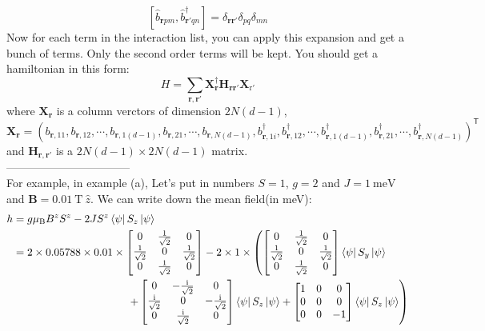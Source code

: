 \documentclass[letter]{article}
\newcommand{\ii}{\mathrm{i}}
\begin{document}
$$
\left[\hat{b}_{\bm{r}pm},\hat{b}^{\dagger}_{\bm{r}'qn}\right]=\delta_{\bm{r}\bm{r}'}\delta_{pq}\delta_{mn}$$
Now for each term in the interaction list, you can apply this expansion and get a bunch of terms. Only the second order terms will be kept. You should get a hamiltonian in this form:
 $$H=\sum_{\bm{r},\bm{r}'}\mathbf{X}^{\dagger}_{\bm{r}}\mathbf{H}_{\bm{r}\bm{r}'}\mathbf{X}_{\mathrm{r}'}$$
 where $\mathbf{X}_{\bm{r}}$ is a column verctors of dimension $2N(d-1)$, $$\mathbf{X}_{\bm{r}}=\left(b_{\bm{r},11},b_{\bm{r},12},\cdots,b_{\bm{r},1(d-1)},b_{\bm{r},21},\cdots,b_{\bm{r},N(d-1)},b_{\bm{r},1i}^{\dagger},b_{\bm{r},12}^{\dagger},\cdots,b_{\bm{r},1(d-1)}^{\dagger},b_{\bm{r},21}^{\dagger},\cdots,b_{\bm{r},N(d-1)}^{\dagger}\right)^{\mathsf{T}}$$
and $\mathbf{H}_{\bm{r},\bm{r}'}$ is a $2N(d-1)\times 2N(d-1)$ matrix.\\
---------------------------------\\
 For example, in example (a), Let's put in numbers $S=1$, $g=2$ and $J=\SI{1}{\milli\electronvolt}$
and $\bm{B}=\SI{0.01}{\tesla}\ \hat{z}.$ We can write down the mean field(in meV):
$$\begin{aligned}
    h&=  g\mu_{\mathrm{B}} B^z S^z-2J S^z \left<\psi\right|S_z\left|\psi\right>\\
    & = 2\times 0.05788\times 0.01\times  \begin{bmatrix}
        0 & \frac{1}{\sqrt{2}} & 0\\
        \frac{1}{\sqrt{2}} &  0 & \frac{1}{\sqrt{2}}\\
        0& \frac{1}{\sqrt{2}}& 0
        \end{bmatrix}-2\times1\times\left( \begin{bmatrix}
            0 & \frac{1}{\sqrt{2}} & 0\\
            \frac{1}{\sqrt{2}} &  0 &\frac{1}{\sqrt{2}}\\
        0& \frac{1}{\sqrt{2}}& 0
            \end{bmatrix} \left<\psi\right|S_y\left|\psi\right>\right.\\
           & {\ \ \ \ \ \ \ \ \ \ \ \ \ \ }\indent \indent\indent\indent\left.+\begin{bmatrix}
                0& -\frac{\ii}{\sqrt{2}} & 0\\
                \frac{\ii}{\sqrt{2}} &  0 & -\frac{\ii}{\sqrt{2}}\\
            0& \frac{\ii}{\sqrt{2}}&0
                \end{bmatrix} \left<\psi\right|S_z\left|\psi\right>+\begin{bmatrix}
            1 & 0 & 0\\
        0 &  0 & 0\\
        0& 0&-1
            \end{bmatrix} \left<\psi\right|S_z\left|\psi\right>\right)
\end{aligned}$$
\end{document}
